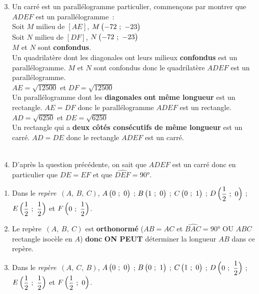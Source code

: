 \documentclass[a4paper,12pt,twocolumn,landscape]{article}
\newcommand{\rep}[3]{~$\left(#1,~#2,~#3\right)$}
\begin{document}
\vspace*{-2em}

\newpage

\begin{minipage}{0.45\textwidth}
\thispagestyle{firststyle}

\vspace*{1em}

\begin{enumerate}
	\setcounter{enumi}{2}
	\item Un carré est un parallélogramme particulier, commençons par montrer que $ADEF$ est un parallélogramme~:\\
			Soit $M$ milieu de $[AE]$, $M\begin{pmatrix}-72~;~-23\end{pmatrix}$\\
			Soit $N$ milieu de $[DF]$, $N\begin{pmatrix}-72~;~-23\end{pmatrix}$\\
			$M$ et $N$ sont \textbf{confondus}.\\
			Un quadrilatère dont les diagonales ont leurs milieux \textbf{confondus} est un parallélogramme. $M$ et $N$ sont confondus donc le quadrilatère $ADEF$ est un parallélogramme.\\[1em]
			$AE = \sqrt{12500}$ et $DF = \sqrt{12500}$\\
			Un parallélogramme dont les \textbf{diagonales ont même longueur} est un rectangle. $AE = DF$ donc le parallélogramme $ADEF$ est un rectangle.\\[1em]
			$AD = \sqrt{6250}$ et $DE = \sqrt{6250}$\\			
			Un rectangle qui a \textbf{deux côtés consécutifs de même longueur} est un carré. $AD = DE$ donc le rectangle $ADEF$ est un carré.\\
			
			\\
	\item D'après la question précédente, on sait que $ADEF$ est un carré donc en particulier que $DE = EF$ et que $\widehat{DEF} = 90°$.\\[1em]
\end{enumerate}

\exercice
\begin{enumerate}
	\item Dans le \emph{repère\rep{A}{B}{C}}, $A\begin{pmatrix}0~;~0\end{pmatrix}$ ; $B\begin{pmatrix}1~;~0\end{pmatrix}$ ; $C\begin{pmatrix}0~;~1\end{pmatrix}$ ; $D\begin{pmatrix}\dfrac{1}{2}~;~0\end{pmatrix}$ ; $E\begin{pmatrix}\dfrac{1}{2}~;~\dfrac{1}{2}\end{pmatrix}$ et $F\begin{pmatrix}0~;~\dfrac{1}{2}\end{pmatrix}$.
	\item Le repère\rep{A}{B}{C} est \textbf{orthonormé} ($AB = AC$ et $\widehat{BAC} = 90°$ OU $ABC$ rectangle isocèle en $A$) \textbf{donc} \textbf{ON PEUT} déterminer la longueur $AB$ dans ce repère.
	\item Dans le \emph{repère\rep{A}{C}{B}}, $A\begin{pmatrix}0~;~0\end{pmatrix}$ ; $B\begin{pmatrix}0~;~1\end{pmatrix}$ ; $C\begin{pmatrix}1~;~0\end{pmatrix}$ ; $D\begin{pmatrix}0~;~\dfrac{1}{2}\end{pmatrix}$ ; $E\begin{pmatrix}\dfrac{1}{2}~;~\dfrac{1}{2}\end{pmatrix}$ et $F\begin{pmatrix}\dfrac{1}{2}~;~0\end{pmatrix}$.
\end{enumerate}

\end{minipage}
\end{document}
